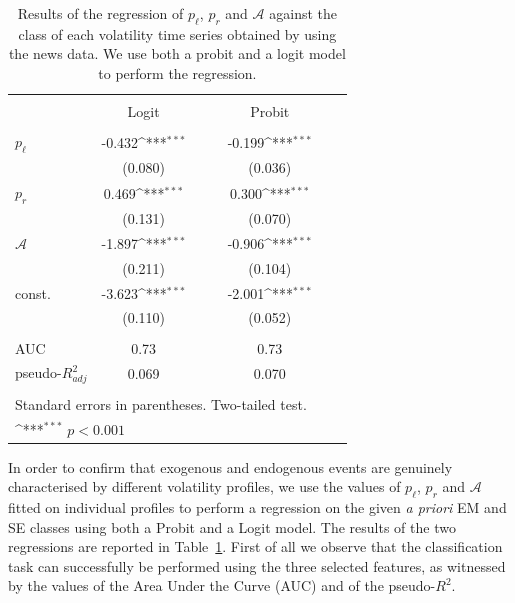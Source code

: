 \documentclass[amsmath,amssymb,aps,pre,floatfix,twocolumn,superscriptaddress]{revtex4}
\begin{document}
\begin{table}
\centering
  \caption{Results of the regression of $p_\ell $, $p_r$ and $ \mathcal{A}$ against the class of each volatility time series obtained by using the news data. We use both a probit and a logit model to perform the regression.} 
  \label{tab: regressions} 
{
\def\sym#1{\ifmmode^{#1}\else\(^{#1}\)\fi}
\begin{tabular}{l*{5}{c}}
\hline\hline\\[-1.8ex] 
            &\multicolumn{1}{c}{Logit} & $\quad$ & \multicolumn{1}{c}{Probit}\\
\hline\\[-2.2ex] 
$p_{\ell}$      &      -0.432\sym{***} & $\quad$ &      -0.199\sym{***}\\
            &    (0.080)         & $\quad$ &    (0.036)    \\
[1em]            
$p_r$     &     0.469\sym{***} & $\quad$ &     0.300\sym{***} \\
            &   (0.131)         & $\quad$ &   (0.070)       \\
[1em] 

$\mathcal{A}$      &      -1.897\sym{***}  & $\quad$ &      -0.906\sym{***} \\
            &   (0.211)         & $\quad$ &    (0.104)       \\
[1em] 

const.      &      -3.623\sym{***}  & $\quad$ &      -2.001\sym{***} \\
            &   (0.110)         & $\quad$ &    (0.052)       \\
[1em]

\hline\\[-2.2ex] 
AUC      &        0.73         & $\quad$ &        0.73       \\
pseudo-$R^2_{adj}$   &       0.069         & $\quad$ &       0.070    \\
\hline\hline\\[-1.8ex] 
\multicolumn{4}{l}{\footnotesize Standard errors in parentheses. Two-tailed test.}\\
\multicolumn{4}{l}{\footnotesize \sym{***} $p<0.001$}\\
\end{tabular}
}
\end{table}

In order to confirm that exogenous and endogenous events are genuinely characterised by different volatility profiles, we use the values of $p_\ell$, $p_r$ and $\mathcal{A}$ fitted on individual profiles to perform a regression on the given \emph{a priori} EM and SE classes using both a Probit and a Logit model. The results of the two regressions are reported in Table~\ref{tab: regressions}. First of all we observe that the classification task can successfully be performed using the three selected features, as witnessed by the values of the Area Under the Curve (AUC) and of the pseudo-$R^2$. 
\end{document}
